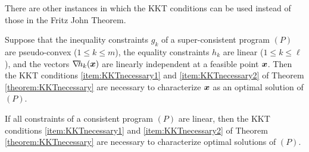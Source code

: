\separator

There are other instances in which the KKT conditions can be used instead of those in the Fritz John Theorem.

\begin{theorem}\label{theorem:Slater}
Suppose that the inequality constraints $g_k$ of a super-consistent program $(P)$ are pseudo-convex ($1\leq k \leq m$), the equality constraints $h_k$ are linear ($1\leq k \leq \ell$), and the vectors $\mathop{\nabla\! {h_k}}(\boldsymbol{x})$ are linearly independent at a feasible point $\boldsymbol{x}$.  Then the KKT conditions \ref{item:KKTnecessary1} and \ref{item:KKTnecessary2} of Theorem \ref{theorem:KKTnecessary} are necessary to characterize $\boldsymbol{x}$ as an optimal solution of $(P)$.
\end{theorem}

\begin{theorem}\label{theorem:KKTAllLinear}
If all constraints of a consistent program $(P)$ are linear, then the KKT conditions \ref{item:KKTnecessary1} and \ref{item:KKTnecessary2} of Theorem \ref{theorem:KKTnecessary} are necessary to characterize optimal solutions of $(P)$.
\end{theorem}